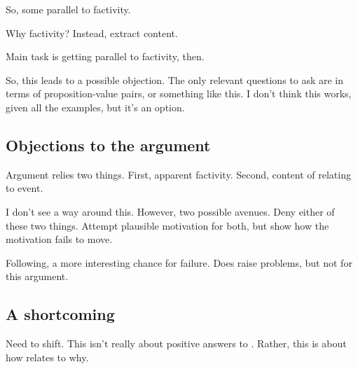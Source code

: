 \begin{note}
  So, some parallel to factivity.

  Why factivity?
  Instead, extract content.

  Main task is getting parallel to factivity, then.
\end{note}

\begin{note}
  \begin{argument}
    {
      \color{blue}
      So, this leads to a possible objection.
      The only relevant questions to ask are in terms of proposition-value pairs, or something like this.
      I don't think this works, given all the examples, but it's an option.
    }
  \end{argument}
\end{note}

\subsection{Objections to the argument}
\label{sec:objections-argument}

\begin{note}
  Argument relies two things.
  First, apparent factivity.
  Second, content of \qzS{} relating to event.

  I don't see a way around this.
  However, two possible avenues.
  Deny either of these two things.
  Attempt plausible motivation for both, but show how the motivation fails to move.

  Following, a more interesting chance for failure.
  Does raise problems, but not for this argument.
\end{note}

\subsection{A shortcoming}
\label{sec:shortcoming}

\begin{note}
  \color{red}
  Need to shift.
  This isn't really about positive answers to \qzS{}.
  Rather, this is about how \qzS{} relates to why.
\end{note}

